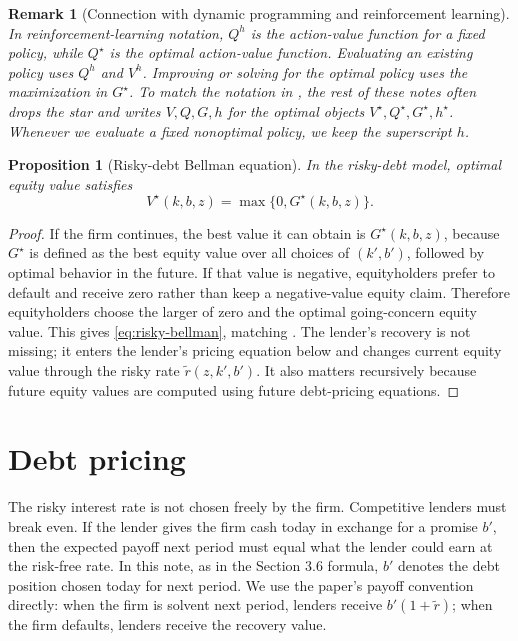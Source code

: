 \documentclass[11pt]{article}
\newtheorem{proposition}{Proposition}
\newtheorem{remark}{Remark}
\newcommand{\1}{\mathbf{1}}
\begin{document}
\begin{remark}[Connection with dynamic programming and reinforcement learning]
\label{rem:dp-rl-policy}
In reinforcement-learning notation, \(Q^h\) is the action-value function for a
fixed policy, while \(Q^\star\) is the optimal action-value function. Evaluating
an existing policy uses \(Q^h\) and \(V^h\). Improving or solving for the optimal
policy uses the maximization in \(G^\star\). To match the notation in
\citet[Section 3.6]{strebulaev2012dynamic}, the rest of these notes often drops
the star and writes \(V,Q,G,h\) for the optimal objects
\(V^\star,Q^\star,G^\star,h^\star\). Whenever we evaluate a fixed nonoptimal
policy, we keep the superscript \(h\).
\end{remark}

\begin{proposition}[Risky-debt Bellman equation]
\label{prop:risky-bellman}
In the risky-debt model, optimal equity value satisfies
\begin{equation}
  V^\star(k,b,z)
  =
  \max\{0,G^\star(k,b,z)\}.
  \label{eq:risky-bellman}
\end{equation}
\end{proposition}

\begin{proof}
If the firm continues, the best value it can obtain is \(G^\star(k,b,z)\),
because \(G^\star\) is defined as the best equity value over all choices of
\((k',b')\), followed by optimal behavior in the future. If that value is
negative, equityholders prefer to default and receive zero rather than keep a
negative-value equity claim. Therefore equityholders choose the larger of zero
and the optimal going-concern equity value. This gives
\cref{eq:risky-bellman}, matching \citet[eq. (3.28)]{strebulaev2012dynamic}.
The lender's recovery is not missing; it enters the lender's pricing equation
below and changes current equity value through the risky rate
\(\widetilde r(z,k',b')\). It also matters recursively because future equity
values are computed using future debt-pricing equations.
\end{proof}

\section{Debt pricing}

The risky interest rate is not chosen freely by the firm. Competitive lenders
must break even. If the lender gives the firm cash today in exchange for a
promise \(b'\), then the expected payoff next period must equal what the lender
could earn at the risk-free rate.
In this note, as in the Section 3.6 formula, \(b'\) denotes the debt position
chosen today for next period. We use the paper's payoff convention directly:
when the firm is solvent next period, lenders receive \(b'(1+\widetilde r)\);
when the firm defaults, lenders receive the recovery value.
\end{document}
